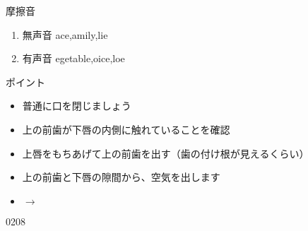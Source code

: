 \documentclass[aspectratio=169,xcolor={dvipsnames,table}]{beamer}
\begin{document}
 \begin{frame}[plain,label=slide_f_v]{摩擦音}

\large

\begin{enumerate}
 \item  無声音 \hspace{22pt}ace,\hspace{1\zw}amily,\hspace{1\zw}lie
 \item  有声音 \hspace{20pt}egetable,\hspace{1\zw}oice,\hspace{1\zw}loe
\end{enumerate}


\vspace*{15pt}

\normalsize
ポイント

\begin{itemize}[<+->][circle]
 \item 普通に口を閉じましょう
 \item 上の前歯が下唇の内側に触れていることを確認
 \item 上唇をもちあげて上の前歯を出す（歯の付け根が見えるくらい）
 \item 上の前歯と下唇の隙間から、空気を出します
 \item {} $\longrightarrow$ 
\end{itemize}

\vspace{-10pt}

\hfill{\tiny 0208}\,{\scriptsize {}}

\end{frame}
\end{document}
